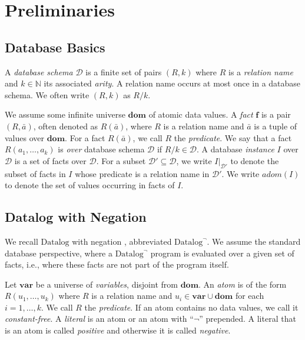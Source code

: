 \documentclass{tlp}
\newcommand{\langname}[1]{\text{#1}}  \newcommand{\pred}[1]{\mathtt{#1}}  \newcommand{\fname}[1]{\mathit{#1}}  \newcommand{\sq}[1]{`{#1}'}
\newcommand{\datalogneg}{\langname{Datalog}^{\neg}}
\newcommand{\datalog}{\langname{Datalog}}
\newcommand{\Nat}{\mathbb{N}}  \newcommand{\len}[1]{|#1|} \newcommand{\rom}[1]{\text{\emph{(#1)}}} \newcommand{\romI}{\rom i}
\newcommand{\fc}{\boldsymbol{f}}
\newcommand{\rar}[2]{#1/#2}
\newcommand{\proj}[2]{#1|_{#2}}
\newcommand{\adom}[1]{\fname{adom}(#1)}
\newcommand{\sch}{\mathcal{D}}
\newcommand{\univ}{\mathbf{dom}}
\newcommand{\uvar}{\mathbf{var}}
\begin{document}
\section{Preliminaries}

\label{sec:preliminaries}


\subsection{Database Basics}

\label{sub:databases-basics}

A \emph{database schema} $\sch$ is a finite set of pairs $(R,k)$
where $R$ is a \emph{relation name} and $k\in\Nat$ its associated
\emph{arity}. A relation name occurs at most once in a database
schema. We often write $(R,k)$ as $\rar Rk$.

We assume some infinite universe $\univ$ of atomic data values. A
\emph{fact} $\fc$ is a pair $(R,\bar{a})$, often denoted as $R(\bar{a})$,
where $R$ is a relation name and $\bar{a}$ is a tuple of values
over $\univ$. For a fact $R(\bar{a})$, we call $R$ the \emph{predicate}.
We say that a fact $R(a_{1},\ldots,a_{k})$ is \emph{over} database
schema $\sch$ if $\rar Rk\in\sch$. A database \emph{instance}
$I$ over $\sch$ is a set of facts over $\sch$. For a subset $\sch'\subseteq\sch$,
we write $\proj I{\sch'}$ to denote the subset of facts in $I$ whose
predicate is a relation name in $\sch'$. We write $\adom I$ to denote
the set of values occurring in facts of $I$.


\subsection{Datalog with Negation}

\label{sub:datalog-with-negation}

We recall $\datalog$ with negation \cite{ahv_book}, abbreviated
$\datalogneg$. We assume the standard database perspective, where
a $\datalogneg$ program is evaluated over a given set of facts, i.e.,
where these facts are not part of the program itself.

Let $\uvar$ be a universe of \emph{variables}, disjoint from $\univ$.
An \emph{atom} is of the form $R(u_{1},\ldots,u_{k})$ where $R$
is a relation name and $u_{i}\in\uvar\cup\univ$ for each $i=1,\ldots,k$.
We call $R$ the \emph{predicate}. If an atom contains no data values,
we call it \emph{constant-free}. A \emph{literal} is an atom or
an atom with ``$\neg$'' prepended. A literal that is an atom is
called \emph{positive} and otherwise it is called \emph{negative}.
\end{document}
